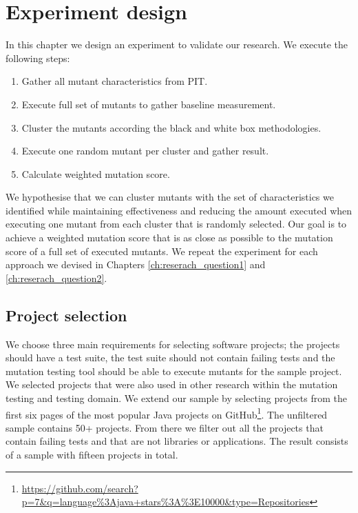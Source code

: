 \documentclass[../main]{subfiles}
\begin{document}
\chapter{Experiment design}
In this chapter we design an experiment to validate our research.
We execute the following steps:
\begin{enumerate}
    \item Gather all mutant characteristics from PIT.
    \item Execute full set of mutants to gather baseline measurement.
    \item Cluster the mutants according the black and white box methodologies.
    \item Execute one random mutant per cluster and gather result.
    \item Calculate weighted mutation score.
\end{enumerate}
We hypothesise that we can cluster mutants with the set of characteristics we identified
while maintaining effectiveness and reducing the amount executed when executing one mutant from each cluster that is randomly selected.
Our goal is to achieve a weighted mutation score that is as close as possible to the mutation score of a full set of executed mutants.
We repeat the experiment for each approach we devised in Chapters \ref{ch:reserach_question1} and \ref{ch:reserach_question2}.

\section{Project selection}
\label{ch:project_selection}
We choose three main requirements for selecting software projects; the projects should have a test suite, the test suite should not contain failing tests and the mutation testing tool should be able to execute mutants for the sample project.
We selected projects that were also used in other research within the mutation testing and testing domain\cite{Pizzoleto2019,Yu2019PossibilityScope,Wei2021SpectralTesting, Zhang2019PredictiveTesting, Chen2018SpeedingStudy, Laurent2017AssessingPIT}.
\newline
We extend our sample by selecting projects from the first six pages of the most popular Java projects on GitHub\footnote{\url{https://github.com/search?p=7&q=language\%3Ajava+stars\%3A\%3E10000&type=Repositories}}.
The unfiltered sample contains 50+ projects.
From there we filter out all the projects that contain failing tests and that are not libraries or applications.
The result consists of a sample with fifteen projects in total.
\end{document}
